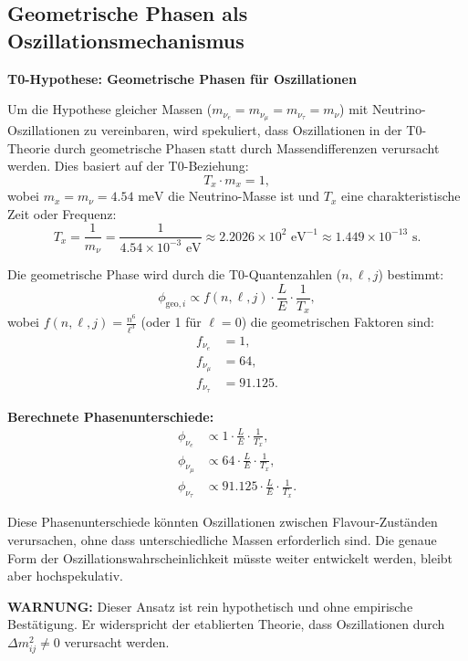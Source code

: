 	\subsection{Geometrische Phasen als Oszillationsmechanismus}
	
	\begin{speculation}
		\textbf{T0-Hypothese: Geometrische Phasen für Oszillationen}
		
		Um die Hypothese gleicher Massen (\(m_{\nu_e} = m_{\nu_\mu} = m_{\nu_\tau} = m_\nu\)) mit Neutrino-Oszillationen zu vereinbaren, wird spekuliert, dass Oszillationen in der T0-Theorie durch geometrische Phasen statt durch Massendifferenzen verursacht werden. Dies basiert auf der T0-Beziehung:
		\[
		T_x \cdot m_x = 1,
		\]
		wobei \(m_x = m_\nu = 4.54 \text{ meV}\) die Neutrino-Masse ist und \(T_x\) eine charakteristische Zeit oder Frequenz:
		\[
		T_x = \frac{1}{m_\nu} = \frac{1}{4.54 \times 10^{-3} \text{ eV}} \approx 2.2026 \times 10^2 \text{ eV}^{-1} \approx 1.449 \times 10^{-13} \text{ s}.
		\]
		
		Die geometrische Phase wird durch die T0-Quantenzahlen (\(n, \ell, j\)) bestimmt:
		\[
		\phi_{\text{geo}, i} \propto f(n, \ell, j) \cdot \frac{L}{E} \cdot \frac{1}{T_x},
		\]
		wobei \(f(n, \ell, j) = \frac{n^6}{\ell^3}\) (oder 1 für \(\ell = 0\)) die geometrischen Faktoren sind:
		\begin{align}
			f_{\nu_e} &= 1, \\
			f_{\nu_\mu} &= 64, \\
			f_{\nu_\tau} &= 91.125.
		\end{align}
		
		\textbf{Berechnete Phasenunterschiede:}
		\begin{align}
			\phi_{\nu_e} &\propto 1 \cdot \frac{L}{E} \cdot \frac{1}{T_x}, \\
			\phi_{\nu_\mu} &\propto 64 \cdot \frac{L}{E} \cdot \frac{1}{T_x}, \\
			\phi_{\nu_\tau} &\propto 91.125 \cdot \frac{L}{E} \cdot \frac{1}{T_x}.
		\end{align}
		
		Diese Phasenunterschiede könnten Oszillationen zwischen Flavour-Zuständen verursachen, ohne dass unterschiedliche Massen erforderlich sind. Die genaue Form der Oszillationswahrscheinlichkeit müsste weiter entwickelt werden, bleibt aber hochspekulativ.
		
		\textbf{WARNUNG:} Dieser Ansatz ist rein hypothetisch und ohne empirische Bestätigung. Er widerspricht der etablierten Theorie, dass Oszillationen durch \(\Delta m^2_{ij} \neq 0\) verursacht werden.
	\end{speculation}
	
